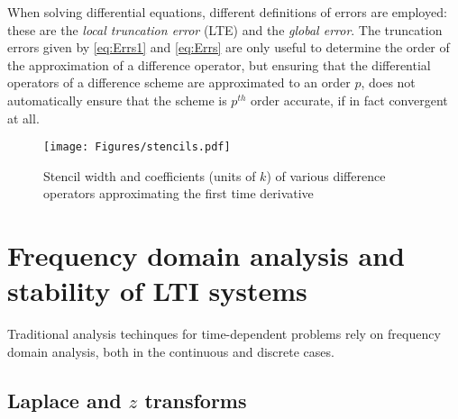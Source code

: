\documentclass[11pt,twoside,a4paper,english]{book}
\begin{document}
When solving differential equations, different definitions of errors are employed: these are the \emph{local truncation error} (LTE) and the \emph{global error}. The truncation errors given by \eqref{eq:Errs1} and \eqref{eq:Errs} are only useful to determine the order of the approximation of a difference operator, but ensuring that the differential operators of a difference scheme are approximated to an order $p$, does not automatically ensure that the scheme is $p^{th}$ order accurate, if in fact convergent at all.

 
\begin{figure}
    \texttt{[image: Figures/stencils.pdf]}
    \caption{Stencil width and coefficients (units of $k$) of various difference operators approximating the first time derivative}\label{fig:stencil}
\end{figure}


\section{Frequency domain analysis and stability of LTI systems}\label{sec:FreqDomAn}

Traditional analysis techinques for time-dependent problems rely on frequency domain analysis, both in the continuous and discrete cases.

\subsection{Laplace and $z$ transforms}
\end{document}
